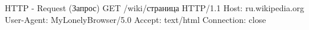 \begin{frame}{HTTP - Request (Запрос)}
GET /wiki/страница HTTP/1.1 \newline
Host: ru.wikipedia.org \newline
User-Agent: MyLonelyBrowser/5.0 \newline
Accept: text/html \newline
Connection: close \newline
\newline
\end{frame}